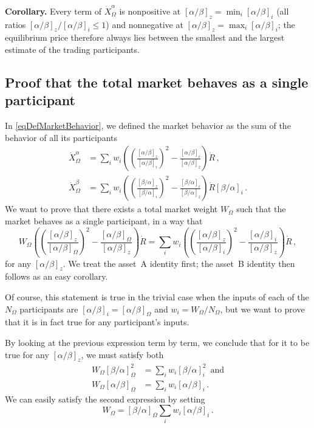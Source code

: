 \documentclass[letterpaper]{article}
\newcommand{\priceAB}{\left[\alpha / \beta\right]}
\newcommand{\priceBA}{\left[\beta / \alpha\right]}
\begin{document}
\textbf{Corollary.} Every term of $\dot{X}_\Omega^\alpha$ is nonpositive at $\priceAB_z = \min_i \priceAB_i$ (all ratios $\priceAB_z/\priceAB_i \leq 1$) and nonnegative at $\priceAB_z = \max_i \priceAB_i$; the equilibrium price therefore always lies between the smallest and the largest estimate of the trading participants.

\subsection{Proof that the total market behaves as a single participant}\label{secProofTotalMarketWeight}

In \eqref{eqDefMarketBehavior}, we defined the market behavior as the sum of the behavior of all its participants
\begin{align*}
    \dot{X}_\Omega^\alpha &= \sum_i w_i \left( \left( \frac{\priceAB_z}{\priceAB_i}\right)^2 - \frac{\priceAB_i}{\priceAB_z} \right) \dot{R} \,,\\
    \dot{X}_\Omega^\beta &= \sum_i w_i \left( \left( \frac{\priceBA_z}{\priceBA_i}\right)^2 - \frac{\priceBA_i}{\priceBA_z} \right) \dot{R} \priceBA_i \,.
\end{align*}
We want to prove that there exists a total market weight $W_\Omega$ such that the market behaves as a single participant, in a way that
\begin{equation*}
    W_\Omega\left(\left(\frac{\priceAB_z}{\priceAB_\Omega}\right)^2-\frac{\priceAB_\Omega}{\priceAB_z}\right) \dot{R} = \sum_i w_i \left( \left( \frac{\priceAB_z}{\priceAB_i}\right)^2 - \frac{\priceAB_i}{\priceAB_z} \right) \dot{R} \,,
\end{equation*}
for any $\priceAB_z$. We treat the asset~A identity first; the asset~B identity then follows as an easy corollary.

Of course, this statement is true in the trivial case when the inputs of each of the $N_\Omega$ participants are $\priceAB_i = \priceAB_\Omega$ and $w_i=W_\Omega / N_\Omega$, but we want to prove that it is in fact true for any participant's inputs.

By looking at the previous expression term by term, we conclude that for it to be true for any $\priceAB_z$, we must satisfy both
\begin{align*}
    W_\Omega \priceBA_\Omega^2 &= \sum_i w_i \priceBA_i^2 \, \text{ and}\\
    W_\Omega \priceAB_\Omega &= \sum_i w_i \priceAB_i\,.
\end{align*}
We can easily satisfy the second expression by setting
\begin{equation*}
    W_\Omega = \priceBA_\Omega \sum_i w_i \priceAB_i\,.
\end{equation*}
\end{document}
